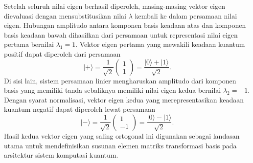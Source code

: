 Setelah seluruh nilai eigen berhasil diperoleh, masing-masing vektor eigen dievaluasi dengan mensubstitusikan nilai $\lambda$ kembali ke dalam persamaan nilai eigen. Hubungan amplitudo antara komponen basis keadaan atas dan komponen basis keadaan bawah dihasilkan dari persamaan untuk representasi nilai eigen pertama bernilai $\lambda_1 = 1$. Vektor eigen pertama yang mewakili keadaan kuantum positif dapat diperoleh dari persamaan
\begin{equation}
\label{eq:eigen_vector_1}
|+\rangle = \frac{1}{\sqrt{2}} \begin{pmatrix} 1 \\ 1 \end{pmatrix} = \frac{|0\rangle + |1\rangle}{\sqrt{2}}.
\end{equation}
Di sisi lain, sistem persamaan linier mengharuskan amplitudo dari komponen basis yang memiliki tanda sebaliknya memiliki nilai eigen kedua bernilai $\lambda_2 = -1$. Dengan syarat normalisasi, vektor eigen kedua yang merepresentasikan keadaan kuantum negatif dapat diperoleh lewat persamaan
\begin{equation}
\label{eq:eigen_vector_2}
|-\rangle = \frac{1}{\sqrt{2}} \begin{pmatrix} 1 \\ -1 \end{pmatrix} = \frac{|0\rangle - |1\rangle}{\sqrt{2}}.
\end{equation}
Hasil kedua vektor eigen yang saling ortogonal ini digunakan sebagai landasan utama untuk mendefinisikan susunan elemen matriks transformasi basis pada arsitektur sistem komputasi kuantum.

